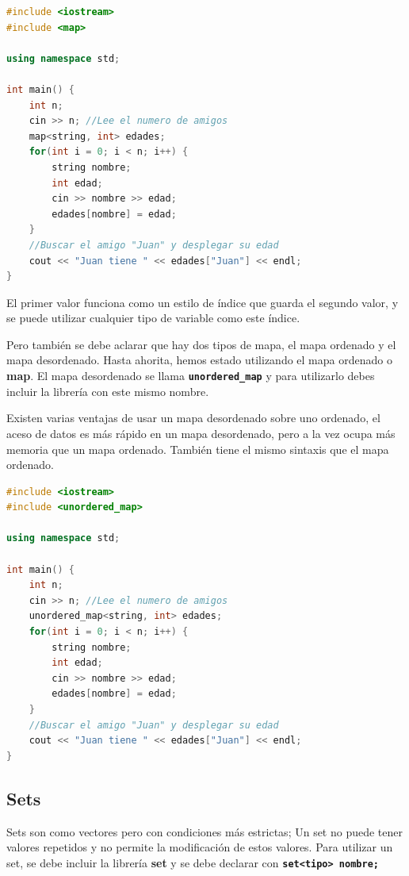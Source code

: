 \documentclass{article}
\begin{document}
\begin{lstlisting}[language=C++, caption=Implementación con map]
#include <iostream>
#include <map>

using namespace std;

int main() {
    int n;
    cin >> n; //Lee el numero de amigos
    map<string, int> edades;
    for(int i = 0; i < n; i++) {
        string nombre;
        int edad;
        cin >> nombre >> edad;
        edades[nombre] = edad;
    }
    //Buscar el amigo "Juan" y desplegar su edad
    cout << "Juan tiene " << edades["Juan"] << endl;
}
\end{lstlisting}

El primer valor funciona como un estilo de índice que guarda el segundo valor, y se puede utilizar cualquier tipo de variable como este índice.

Pero también se debe aclarar que hay dos tipos de mapa, el mapa ordenado y el mapa desordenado. Hasta ahorita, hemos estado utilizando el mapa ordenado o \textbf{map}. El mapa desordenado se llama \textbf{\lstinline{unordered_map}} y para utilizarlo debes incluir la librería con este mismo nombre.

Existen varias ventajas de usar un mapa desordenado sobre uno ordenado, el aceso de datos es más rápido en un mapa desordenado, pero a la vez ocupa más memoria que un mapa ordenado. También tiene el mismo sintaxis que el mapa ordenado.

\begin{lstlisting}[language=C++, caption=Mapa desordenado]
#include <iostream>
#include <unordered_map>

using namespace std;

int main() {
    int n;
    cin >> n; //Lee el numero de amigos
    unordered_map<string, int> edades;
    for(int i = 0; i < n; i++) {
        string nombre;
        int edad;
        cin >> nombre >> edad;
        edades[nombre] = edad;
    }
    //Buscar el amigo "Juan" y desplegar su edad
    cout << "Juan tiene " << edades["Juan"] << endl;
}
\end{lstlisting}

\subsection{Sets}

Sets son como vectores pero con condiciones más estrictas; Un set no puede tener valores repetidos y no permite la modificación de estos valores. Para utilizar un set, se debe incluir la librería \textbf{set} y se debe declarar con \textbf{\lstinline{set<tipo> nombre;}}
\end{document}

